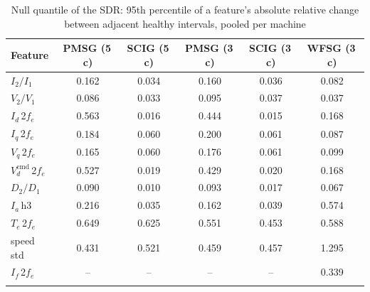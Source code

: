 \begin{table}[t]
\tabsize
\caption{Null quantile of the SDR: 95th percentile of a feature's absolute relative change between adjacent healthy intervals, pooled per machine}\label{tab:null}
\begin{tabular}{@{}lccccc@{}}
\toprule
Feature & PMSG (5\,c) & SCIG (5\,c) & PMSG (3\,c) & SCIG (3\,c) & WFSG (3\,c) \\
\midrule
$I_2/I_1$ & 0.162 & 0.034 & 0.160 & 0.036 & 0.082 \\
$V_2/V_1$ & 0.086 & 0.033 & 0.095 & 0.037 & 0.037 \\
$I_d$\,2$f_e$ & 0.563 & 0.016 & 0.444 & 0.015 & 0.168 \\
$I_q$\,2$f_e$ & 0.184 & 0.060 & 0.200 & 0.061 & 0.087 \\
$V_q$\,2$f_e$ & 0.165 & 0.060 & 0.176 & 0.061 & 0.099 \\
$V_d^{\mathrm{cmd}}$\,2$f_e$ & 0.527 & 0.019 & 0.429 & 0.020 & 0.168 \\
$D_2/D_1$ & 0.090 & 0.010 & 0.093 & 0.017 & 0.067 \\
$I_a$\,h3 & 0.216 & 0.035 & 0.162 & 0.039 & 0.574 \\
$T_e$\,2$f_e$ & 0.649 & 0.625 & 0.551 & 0.453 & 0.588 \\
speed std & 0.431 & 0.521 & 0.459 & 0.457 & 1.295 \\
$I_f$\,2$f_e$ & -- & -- & -- & -- & 0.339 \\
\botrule
\end{tabular}
\end{table}
